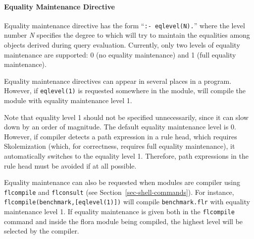 \documentclass[11pt]{report}
\begin{document}
\paragraph{Equality Maintenance Directive} Equality maintenance directive has
the form ``{\tt :- eqlevel(N).}''  where the level number \emph{N}
specifies the degree to which \FLORA will try to maintain the equalities
among objects derived during query evaluation. Currently, only two levels
of equality maintenance are supported: 0 (no equality maintenance) and 1
(full equality maintenance).

Equality maintenance directives can appear in several places in a \FLORA
program. However, if  {\tt eqlevel(1)} is requested somewhere in the
module, \FLORA will compile the module with equality maintenance
level 1.

Note that equality level 1 should not be specified unnecessarily, since it
can slow \FLORA down by an order of magnitude.  The default equality
maintenance level is 0. However, if \FLORA compiler detects a path
expression in a rule head, which requires Skolemization (which, for
correctness, requires full equality maintenance), it automatically switches
to the equality level 1.  Therefore, path expressions in the rule head must
be avoided if at all possible.

Equality maintenance can also be requested when \FLORA modules are compiler
using {\tt flcompile} and {\tt flconsult} (see
Section~\ref{sec-shell-commands}). For instance, {\tt
  flcompile(benchmark,[eqlevel(1)])} will compile {\tt benchmark.flr} with
equality maintenance level 1.  If equality maintenance is given both in the
{\tt flcompile} command and inside the flora module being compiled, the
highest level will be selected by the compiler.

\end{document}
